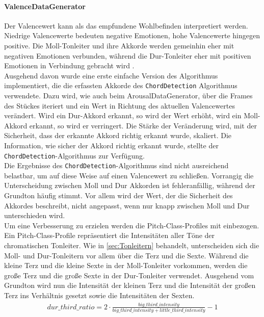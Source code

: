 \documentclass[11pt,a4paper]{article}
\begin{document}
\paragraph{ValenceDataGenerator}
Der Valencewert kann als das empfundene Wohlbefinden interpretiert werden. Niedrige Valencewerte bedeuten negative Emotionen, hohe Valencewerte hingegen positive. Die Moll-Tonleiter und ihre Akkorde werden gemeinhin eher mit negativen Emotionen verbunden, während die Dur-Tonleiter eher mit positiven Emotionen in Verbindung gebracht wird \cite{dalla2001developmental}.\\
Ausgehend davon wurde eine erste einfache Version des Algorithmus implementiert, die die erfassten Akkorde des \lstinline!ChordDetection! Algorithmus verwendete. Dazu wird, wie auch beim ArousalDataGenerator, über die Frames des Stückes iteriert und ein Wert in Richtung des aktuellen Valencewertes verändert. Wird ein Dur-Akkord erkannt, so wird der Wert erhöht, wird ein Moll-Akkord erkannt, so wird er verringert. Die Stärke der Veränderung wird, mit der Sicherheit, dass der erkannte Akkord richtig erkannt wurde, skaliert. Die Information, wie sicher der Akkord richtig erkannt wurde, stellte der \lstinline!ChordDetection!-Algorithmus zur Verfügung.\\
Die Ergebnisse des \lstinline!ChordDetection!-Algorithmus sind nicht ausreichend belastbar, um auf diese Weise auf einen Valencewert zu schließen. Vorrangig die Unterscheidung zwischen Moll und Dur Akkorden ist fehleranfällig, während der Grundton häufig stimmt. Vor allem wird der Wert, der die Sicherheit des Akkordes beschreibt, nicht angepasst, wenn nur knapp zwischen Moll und Dur unterschieden wird.\\
Um eine Verbesserung zu erzielen werden die Pitch-Class-Profiles mit einbezogen. Ein Pitch-Class-Profile repräsentiert die Intensitäten aller Töne der chromatischen Tonleiter. Wie in \ref{sec:Tonleitern} behandelt, unterscheiden sich die Moll- und Dur-Tonleitern vor allem über die Terz und die Sexte. Während die kleine Terz und die kleine Sexte in der Moll-Tonleiter vorkommen, werden die große Terz und die große Sexte in der Dur-Tonleiter verwendet. Ausgehend vom Grundton wird nun die Intensität der kleinen Terz und die Intensität der großen Terz ins Verhältnis gesetzt sowie die Intensitäten der Sexten.
\begin{align}
dur\_third\_ratio = 2 \cdot \frac{big\_third\_intensity}{big\_third\_intensity + little\_third\_intensity} - 1
\end{align}
\end{document}
